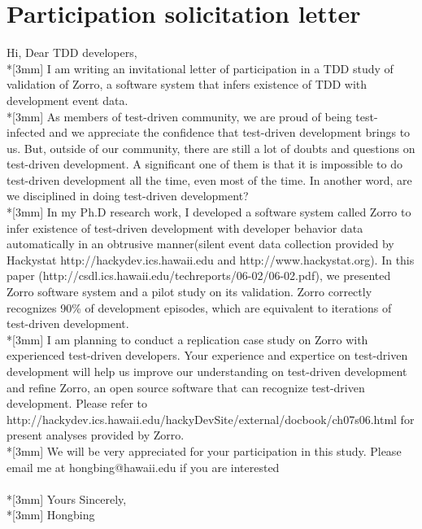 \chapter{Participation solicitation letter}
\label{app:letter}

\noindent Hi, Dear TDD developers,\\*[3mm]
I am writing an invitational letter of participation in a TDD study of
validation of Zorro, a software system that infers existence of TDD with development event data.\\*[3mm]
As members of test-driven community, we are proud of being test-infected
and we appreciate the confidence that test-driven development brings to us.
But, outside of our community, there are still a lot of doubts and
questions on test-driven development.  A significant one of them is that it
is impossible to do test-driven development all the time, even most of the
time. In another word, are we disciplined in doing test-driven development?\\*[3mm]
In my Ph.D research work, I developed a software system called Zorro to
infer existence of test-driven development with developer behavior data
automatically in an obtrusive manner(silent event data collection provided
by Hackystat http://hackydev.ics.hawaii.edu and http://www.hackystat.org).
In this paper (http://csdl.ics.hawaii.edu/techreports/06-02/06-02.pdf), we
presented Zorro software system and a pilot study on its validation.  Zorro
correctly recognizes 90\% of development episodes, which are
equivalent to iterations of test-driven development.\\*[3mm]
I am planning to conduct a replication case study on Zorro with experienced
test-driven developers. Your experience and expertice on test-driven
development will help us improve our understanding on test-driven
development and refine Zorro, an open source software that can recognize
test-driven development. Please refer to
http://hackydev.ics.hawaii.edu/hackyDevSite/external/docbook/ch07s06.html
for present analyses provided by Zorro.\\*[3mm]
We will be very appreciated for your participation in this study. Please
email me at hongbing@hawaii.edu if you are interested\\\\*[3mm]
Yours Sincerely,\\*[3mm]
Hongbing

